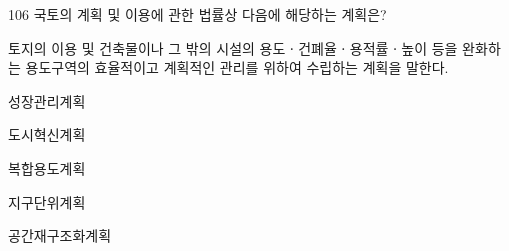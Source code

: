 \begin{question}{106}
국토의 계획 및 이용에 관한 법률상 다음에 해당하는 계획은?
\begin{framedtext}
토지의 이용 및 건축물이나 그 밖의 시설의 용도ㆍ건폐율ㆍ용적률ㆍ높이 등을 완화하는 용도구역의 효율적이고 계획적인 관리를 위하여 수립하는 계획을 말한다.
\end{framedtext}
\begin{choices}
  \item 성장관리계획
  \item 도시혁신계획
  \item 복합용도계획
  \item 지구단위계획
  \item 공간재구조화계획
\end{choices}
\end{question}
